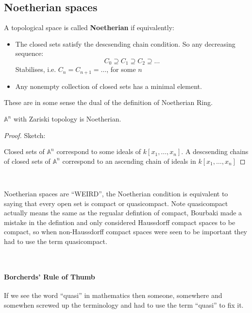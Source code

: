 \subsection{Noetherian spaces}

\begin{definition}
    A topological space is called \textbf{Noetherian} if equivalently:\begin{itemize}
        \item The closed sets satisfy the descsending chain condition. So any decreasing sequence:\begin{equation*}
            C_0\supseteq C_1\supseteq C_2\supseteq \dots
        \end{equation*}
        Stabilises, i.e. $C_n=C_{n+1}=\dots$, for some $n$
        \item Any nonempty collection of closed sets has a minimal element.
    \end{itemize}
\end{definition}
These are in some sense the dual of the definition of Noetherian Ring.

\begin{theorem}
    $\mathbb{A}^n$ with Zariski topology is Noetherian.

    \begin{proof}
        Sketch:

        Closed sets of $\mathbb{A}^n$ correspond to some ideals of $k[x_1,\dots,x_n]$. A descsending chains of closed sets of $\mathbb{A}^n$ correspond to an ascending chain of ideals in $k[x_1,\dots,x_n]$
    \end{proof}
\end{theorem}

\

Noetherian spaces are ``WEIRD'', the Noetherian condition is equivalent to saying that every open set is compact or quasicompact. Note quasicompact actually means the same as the regualar defintion of compact, Bourbaki made a mistake in the defintion and 
only considered Haussdorff compact spaces to be compact, so when non-Haussdorff compact spaces were seen to be important they had to use the term quasicompact.

\

\paragraph*{Borcherds' Rule of Thumb} If we see the word ``quasi'' in mathematics then someone, somewhere and somewhen screwed up the terminology and had to use the term ``quasi'' to fix it.

